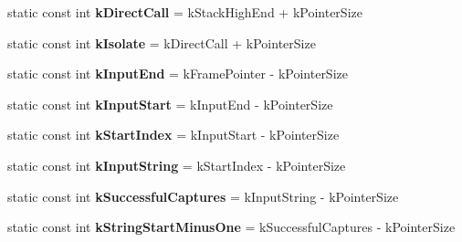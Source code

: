 \begin{DoxyCompactItemize}
\item 
static const int {\bfseries k\+Direct\+Call} = k\+Stack\+High\+End + k\+Pointer\+Size\hypertarget{classv8_1_1internal_1_1_reg_exp_macro_assembler_a_r_m_a97b2eac38cd7a96c3d362d28e12eaf1a}{}\label{classv8_1_1internal_1_1_reg_exp_macro_assembler_a_r_m_a97b2eac38cd7a96c3d362d28e12eaf1a}

\item 
static const int {\bfseries k\+Isolate} = k\+Direct\+Call + k\+Pointer\+Size\hypertarget{classv8_1_1internal_1_1_reg_exp_macro_assembler_a_r_m_a18184673283f37987aa6d4a11737efb9}{}\label{classv8_1_1internal_1_1_reg_exp_macro_assembler_a_r_m_a18184673283f37987aa6d4a11737efb9}

\item 
static const int {\bfseries k\+Input\+End} = k\+Frame\+Pointer -\/ k\+Pointer\+Size\hypertarget{classv8_1_1internal_1_1_reg_exp_macro_assembler_a_r_m_a52d1cc0deb9c668b2f5a6fb9940e5f4a}{}\label{classv8_1_1internal_1_1_reg_exp_macro_assembler_a_r_m_a52d1cc0deb9c668b2f5a6fb9940e5f4a}

\item 
static const int {\bfseries k\+Input\+Start} = k\+Input\+End -\/ k\+Pointer\+Size\hypertarget{classv8_1_1internal_1_1_reg_exp_macro_assembler_a_r_m_a13732e8eb13356daabcec66830c943cc}{}\label{classv8_1_1internal_1_1_reg_exp_macro_assembler_a_r_m_a13732e8eb13356daabcec66830c943cc}

\item 
static const int {\bfseries k\+Start\+Index} = k\+Input\+Start -\/ k\+Pointer\+Size\hypertarget{classv8_1_1internal_1_1_reg_exp_macro_assembler_a_r_m_ae34b480adc6732787375a91150fd2360}{}\label{classv8_1_1internal_1_1_reg_exp_macro_assembler_a_r_m_ae34b480adc6732787375a91150fd2360}

\item 
static const int {\bfseries k\+Input\+String} = k\+Start\+Index -\/ k\+Pointer\+Size\hypertarget{classv8_1_1internal_1_1_reg_exp_macro_assembler_a_r_m_aed6cd2bde1b669bbef7af7a2b2811bee}{}\label{classv8_1_1internal_1_1_reg_exp_macro_assembler_a_r_m_aed6cd2bde1b669bbef7af7a2b2811bee}

\item 
static const int {\bfseries k\+Successful\+Captures} = k\+Input\+String -\/ k\+Pointer\+Size\hypertarget{classv8_1_1internal_1_1_reg_exp_macro_assembler_a_r_m_ac183a4123111b946fa166e87995f2ce6}{}\label{classv8_1_1internal_1_1_reg_exp_macro_assembler_a_r_m_ac183a4123111b946fa166e87995f2ce6}

\item 
static const int {\bfseries k\+String\+Start\+Minus\+One} = k\+Successful\+Captures -\/ k\+Pointer\+Size\hypertarget{classv8_1_1internal_1_1_reg_exp_macro_assembler_a_r_m_a11660bef6fd827f90d733aff073e9a99}{}\label{classv8_1_1internal_1_1_reg_exp_macro_assembler_a_r_m_a11660bef6fd827f90d733aff073e9a99}


\end{DoxyCompactItemize}

